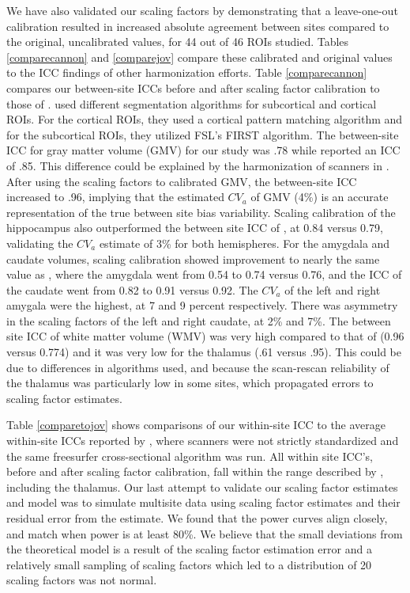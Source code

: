 We have also validated our scaling factors by demonstrating that a leave-one-out calibration resulted in increased absolute agreement between sites compared to the original, uncalibrated values, for 44 out of 46 ROIs studied. Tables \ref{comparecannon} and \ref{comparejov} compare these calibrated and original values to the ICC findings of other harmonization efforts. Table \ref{comparecannon} compares our between-site ICCs before and after scaling factor calibration to those of \cite{cannon2014}. \cite{cannon2014} used different segmentation algorithms for subcortical and cortical ROIs. For the cortical ROIs, they used a cortical pattern matching algorithm \cite{thompson2001detecting} and for the subcortical ROIs, they utilized FSL's FIRST algorithm. The between-site ICC for gray matter volume (GMV) for our study was .78 while \cite{cannon2014} reported an ICC of .85. This difference could be explained by the harmonization of scanners in \cite{cannon2014}. After using the scaling factors to calibrated GMV, the between-site ICC increased to .96, implying that the estimated $CV_a$ of GMV (4\%) is an accurate representation of the true between site bias variability. Scaling calibration of the hippocampus also outperformed the between site ICC of \cite{cannon2014}, at 0.84 versus 0.79, validating the $CV_a$ estimate of 3\% for both hemispheres. For the amygdala and caudate volumes, scaling calibration showed improvement to nearly the same value as \cite{cannon2014}, where the amygdala went from 0.54 to 0.74 versus 0.76, and the ICC of the caudate went from 0.82 to 0.91 versus 0.92. The $CV_a$ of the left and right amygala were the highest, at 7 and 9 percent respectively. There was asymmetry in the scaling factors of the left and right caudate, at 2\% and 7\%. The between site ICC of white matter volume (WMV) was very high compared to that of \cite{cannon2014} (0.96 versus 0.774) and it was very low for the thalamus (.61 versus .95). This could be due to differences in algorithms used, and because the scan-rescan reliability of the thalamus was particularly low in some sites, which propagated errors to scaling factor estimates. 

Table \ref{comparetojov} shows comparisons of our within-site ICC to the average within-site ICCs reported by \cite{jovicich2013brain}, where scanners were not strictly standardized and the same freesurfer cross-sectional algorithm was run. All within site ICC's, before and after scaling factor calibration, fall within the range described by \cite{jovicich2013brain}, including the thalamus. Our last attempt to validate our scaling factor estimates and model was to simulate multisite data using scaling factor estimates and their residual error from the estimate. We found that the power curves align closely, and match when power is at least 80\%. We believe that the small deviations from the theoretical model is a result of the scaling factor estimation error and a relatively small sampling of scaling factors which led to a distribution of 20 scaling factors was not normal.  